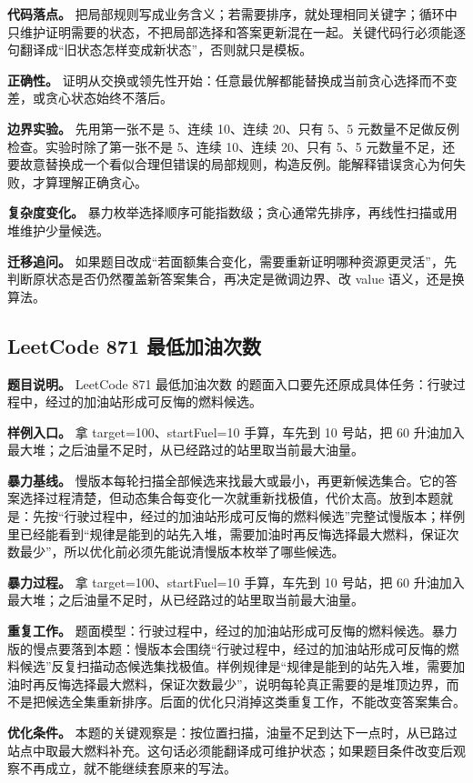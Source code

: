 \textbf{代码落点。} 把局部规则写成业务含义；若需要排序，就处理相同关键字；循环中只维护证明需要的状态，不把局部选择和答案更新混在一起。关键代码行必须能逐句翻译成“旧状态怎样变成新状态”，否则就只是模板。

\textbf{正确性。} 证明从交换或领先性开始：任意最优解都能替换成当前贪心选择而不变差，或贪心状态始终不落后。

\textbf{边界实验。} 先用第一张不是 5、连续 10、连续 20、只有 5、5 元数量不足做反例检查。实验时除了第一张不是 5、连续 10、连续 20、只有 5、5 元数量不足，还要故意替换成一个看似合理但错误的局部规则，构造反例。能解释错误贪心为何失败，才算理解正确贪心。

\textbf{复杂度变化。} 暴力枚举选择顺序可能指数级；贪心通常先排序，再线性扫描或用堆维护少量候选。

\textbf{迁移追问。} 如果题目改成“若面额集合变化，需要重新证明哪种资源更灵活”，先判断原状态是否仍然覆盖新答案集合，再决定是微调边界、改 value 语义，还是换算法。

\subsection{LeetCode 871 最低加油次数}

\textbf{题目说明。} LeetCode 871 最低加油次数 的题面入口要先还原成具体任务：行驶过程中，经过的加油站形成可反悔的燃料候选。

\textbf{样例入口。} 拿 target=100、startFuel=10 手算，车先到 10 号站，把 60 升油加入最大堆；之后油量不足时，从已经路过的站里取当前最大油量。

\textbf{暴力基线。} 慢版本每轮扫描全部候选来找最大或最小，再更新候选集合。它的答案选择过程清楚，但动态集合每变化一次就重新找极值，代价太高。放到本题就是：先按“行驶过程中，经过的加油站形成可反悔的燃料候选”完整试慢版本；样例里已经能看到“规律是能到的站先入堆，需要加油时再反悔选择最大燃料，保证次数最少”，所以优化前必须先能说清慢版本枚举了哪些候选。

\textbf{暴力过程。} 拿 target=100、startFuel=10 手算，车先到 10 号站，把 60 升油加入最大堆；之后油量不足时，从已经路过的站里取当前最大油量。

\textbf{重复工作。} 题面模型：行驶过程中，经过的加油站形成可反悔的燃料候选。暴力版的慢点要落到本题：慢版本会围绕“行驶过程中，经过的加油站形成可反悔的燃料候选”反复扫描动态候选集找极值。样例规律是“规律是能到的站先入堆，需要加油时再反悔选择最大燃料，保证次数最少”，说明每轮真正需要的是堆顶边界，而不是把候选全集重新排序。后面的优化只消掉这类重复工作，不能改变答案集合。

\textbf{优化条件。} 本题的关键观察是：按位置扫描，油量不足到达下一点时，从已路过站点中取最大燃料补充。这句话必须能翻译成可维护状态；如果题目条件改变后观察不再成立，就不能继续套原来的写法。

